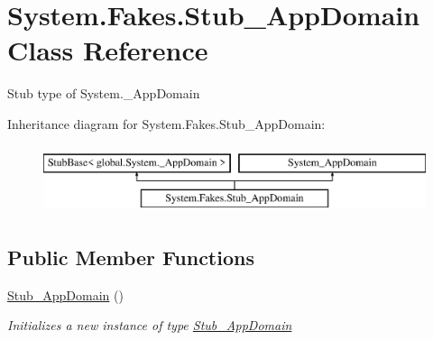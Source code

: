 \hypertarget{class_system_1_1_fakes_1_1_stub___app_domain}{\section{System.\-Fakes.\-Stub\-\_\-\-App\-Domain Class Reference}
\label{class_system_1_1_fakes_1_1_stub___app_domain}
}


Stub type of System.\-\_\-\-App\-Domain 


Inheritance diagram for System.\-Fakes.\-Stub\-\_\-\-App\-Domain\-:\begin{figure}[H]
\begin{center}
\leavevmode
\includegraphics[height=2.000000cm]{class_system_1_1_fakes_1_1_stub___app_domain}
\end{center}
\end{figure}
\subsection*{Public Member Functions}
\begin{DoxyCompactItemize}
\item 
\hyperlink{class_system_1_1_fakes_1_1_stub___app_domain_a795c53f888df66accf0e38c6a18a0505}{Stub\-\_\-\-App\-Domain} ()
\begin{DoxyCompactList}\small\item\em Initializes a new instance of type \hyperlink{class_system_1_1_fakes_1_1_stub___app_domain}{Stub\-\_\-\-App\-Domain}\end{DoxyCompactList}\end{DoxyCompactItemize}
